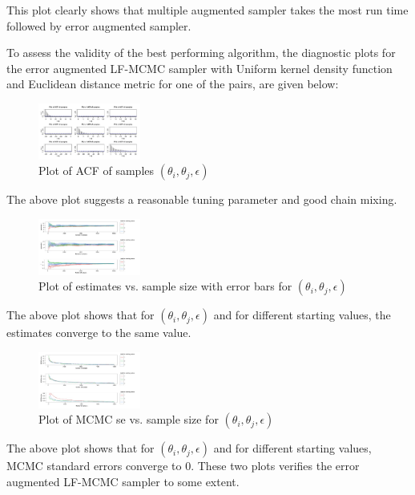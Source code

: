 \begin{multicols}{2}
This plot clearly shows that multiple augmented sampler takes the most run time followed by error augmented sampler.

To assess the validity of the best performing algorithm, the diagnostic plots for the error augmented LF-MCMC sampler with Uniform kernel density function and Euclidean distance metric for one of the pairs, are given below:

\begin{figure}[H]
  \centering
    \includegraphics[width=0.30\textwidth]{plot8.jpeg}
    \caption{Plot of ACF of samples $(\theta_i,\theta_j,\epsilon)$}
    \label{BN}
\end{figure}

The above plot suggests a reasonable tuning parameter and good chain mixing.

\begin{figure}[H]
  \centering
    \includegraphics[width=0.30\textwidth]{plot4.jpeg}
    \caption{Plot of estimates vs. sample size with error bars for $(\theta_i,\theta_j,\epsilon)$}
    \label{BN}
\end{figure}

The above plot shows that for $(\theta_i,\theta_j,\epsilon)$ and for different starting values, the estimates converge to the same value.

\begin{figure}[H]
  \centering
    \includegraphics[width=0.30\textwidth]{plot5.jpeg}
    \caption{Plot of MCMC se vs. sample size for $(\theta_i,\theta_j,\epsilon)$}
    \label{BN}
\end{figure}

The above plot shows that for $(\theta_i,\theta_j,\epsilon)$ and for different starting values, MCMC standard errors converge to $0$. These two plots verifies the error augmented LF-MCMC sampler to some extent.


\end{multicols}
